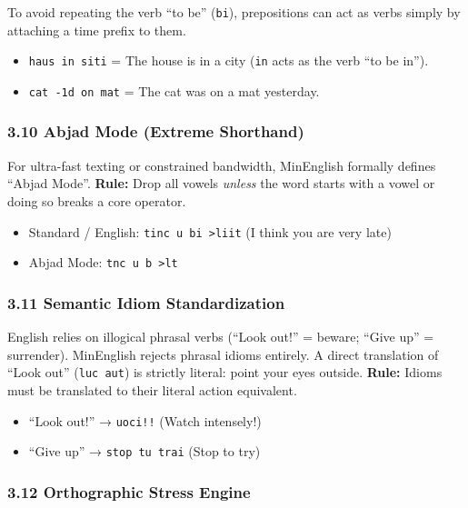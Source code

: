 To avoid repeating the verb ``to be'' (\texttt{bi}), prepositions can
act as verbs simply by attaching a time prefix to them.

\begin{itemize}
\tightlist
\item
  \texttt{haus\ in\ siti} = The house is in a city (\texttt{in} acts as
  the verb ``to be in'').
\item
  \texttt{cat\ -1d\ on\ mat} = The cat was on a mat yesterday.
\end{itemize}

\subsubsection{3.10 Abjad Mode (Extreme
Shorthand)}\label{abjad-mode-extreme-shorthand}

For ultra-fast texting or constrained bandwidth, MinEnglish formally
defines ``Abjad Mode''. \textbf{Rule:} Drop all vowels \emph{unless} the
word starts with a vowel or doing so breaks a core operator.

\begin{itemize}
\tightlist
\item
  Standard / English: \texttt{tinc\ u\ bi\ \textgreater{}liit} (I think
  you are very late)
\item
  Abjad Mode: \texttt{tnc\ u\ b\ \textgreater{}lt}
\end{itemize}

\subsubsection{3.11 Semantic Idiom
Standardization}\label{semantic-idiom-standardization}

English relies on illogical phrasal verbs (``Look out!'' = beware;
``Give up'' = surrender). MinEnglish rejects phrasal idioms entirely. A
direct translation of ``Look out'' (\texttt{luc\ aut}) is strictly
literal: point your eyes outside. \textbf{Rule:} Idioms must be
translated to their literal action equivalent.

\begin{itemize}
\tightlist
\item
  ``Look out!'' → \texttt{uoci!!} (Watch intensely!)
\item
  ``Give up'' → \texttt{stop\ tu\ trai} (Stop to try)
\end{itemize}

\subsubsection{3.12 Orthographic Stress
Engine}\label{orthographic-stress-engine}

